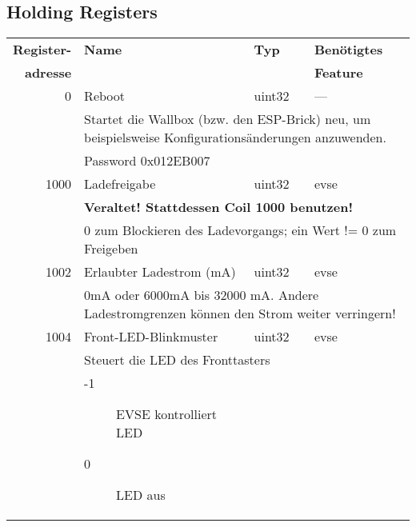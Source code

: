 \documentclass[a4paper,10pt]{article}
\newcommand{\tdesc}[1]{\multicolumn{3}{l}{\footnotesize #1}}
\begin{document}
\subsection*{Holding Registers}
\begin{tabularx}{\textwidth}{rXll} \toprule
    \textbf{Register-} & \textbf{Name} & \textbf{Typ} & \textbf{Benötigtes}                                                     \\
    \textbf{adresse}   &      &     & \textbf{Feature}                                                                          \\ \midrule
0             & Reboot                                  & uint32       & ---                                                    \\
              & \tdesc{Startet die Wallbox (bzw. den ESP-Brick) neu, um beispielsweise Konfigurationsänderungen anzuwenden.}    \\
              & \tdesc{Password 0x012EB007}                                                                                     \\ \cmidrule{2-4}
1000          & Ladefreigabe                            & uint32       & evse                                                   \\
              & \tdesc{\textbf{Veraltet! Stattdessen Coil 1000 benutzen!}}                                                      \\
              & \tdesc{0 zum Blockieren des Ladevorgangs; ein Wert != 0 zum Freigeben}                                          \\ \cmidrule{2-4}
1002          & Erlaubter Ladestrom (mA)                & uint32       & evse                                                   \\
              & \tdesc{0mA oder 6000mA bis 32000 mA. Andere Ladestromgrenzen können den Strom weiter verringern!}               \\ \cmidrule{2-4}
1004          & Front-LED-Blinkmuster                   & uint32       & evse                                                   \\
              & \tdesc{Steuert die LED des Fronttasters}                                                                        \\
              & \begin{description}
                    \item[-1] EVSE kontrolliert LED
                    \item[0] LED aus

\end{description}
\end{tabularx}
\end{document}
